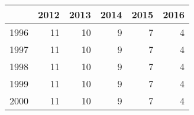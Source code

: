 \begin{tabular}{lrrrrr}
\toprule
{} &  2012 &  2013 &  2014 &  2015 &  2016 \\
\midrule
1996 &    11 &    10 &     9 &     7 &     4 \\
1997 &    11 &    10 &     9 &     7 &     4 \\
1998 &    11 &    10 &     9 &     7 &     4 \\
1999 &    11 &    10 &     9 &     7 &     4 \\
2000 &    11 &    10 &     9 &     7 &     4 \\
\bottomrule
\end{tabular}
